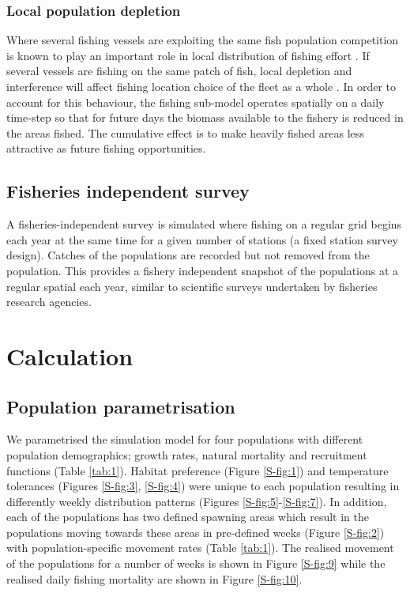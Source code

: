 \documentclass[review]{elsarticle}
\begin{document}
\subsubsection{Local population depletion}

Where several fishing vessels are exploiting the same fish population
competition is known to play an important role in local distribution of fishing
effort \citep{Gillis1998}. If several vessels are fishing on the same patch of
fish, local depletion and interference  will affect
fishing location choice of the fleet as a whole \citep{Rijnsdorp2000,
	Poos2007a}. In order to account for this behaviour, the fishing
sub-model operates spatially on a daily time-step so that for future days the
biomass available to the fishery is reduced in the areas fished. The cumulative
effect is to make heavily fished areas less attractive as future fishing
opportunities. 

\subsection{Fisheries independent survey}

A fisheries-independent survey is simulated where fishing on a regular grid
begins each year at the same time for a given number of stations (a fixed
station survey design). Catches of the populations  are recorded but not removed from the population. This
provides a fishery independent snapshot of the populations at a regular spatial
 each year, similar to scientific
surveys undertaken by fisheries research agencies. 

\section{Calculation}

\subsection{Population parametrisation}

We parametrised the simulation model for four populations with different
population demographics; growth rates, natural mortality and recruitment
functions (Table \ref{tab:1}). Habitat preference (Figure \ref{S-fig:1}) and
temperature tolerances (Figures \ref{S-fig:3}, \ref{S-fig:4}) were unique to
each population resulting in differently weekly distribution patterns (Figures
\ref{S-fig:5}-\ref{S-fig:7}). In addition, each of the populations has two
defined spawning areas which result in the populations moving towards these
areas in pre-defined weeks (Figure \ref{S-fig:2}) with population-specific
movement rates (Table \ref{tab:1}). The realised movement of the populations
for a number of weeks is shown in Figure \ref{S-fig:9} while the realised daily
fishing mortality are shown in Figure \ref{S-fig:10}. 
\end{document}
